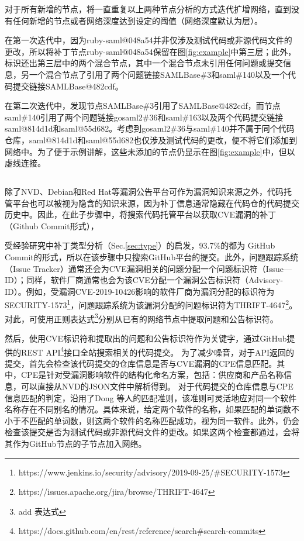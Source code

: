 对于所有新增的节点，\tool 将一直重复以上两种节点分析的方式迭代扩增网络，直到没有任何新增的节点或者网络深度达到设定的阈值（网络深度默认为层）。

\begin{exmp}
在第一次迭代中，因为ruby-saml@048a54并非仅涉及测试代码或非源代码文件的更改，所以\tool 将补丁节点ruby-saml@048a54保留在图\ref{fig:example}中第三层；此外，\tool 标识还出第三层中的两个混合节点，其中一个混合节点未引用任何问题或提交信息，另一个混合节点了引用了两个问题链接SAMLBase\#3和saml\#140以及一个代码提交链接SAMLBase@482cdf。 

在第二次迭代中，\tool 发现节点SAMLBase\#3引用了SAMLBase@482cdf，而节点saml\#140引用了两个问题链接gosaml2\#36和saml\#163以及两个代码提交链接saml@814d1d和saml@55d682。考虑到gosaml2\#36与saml\#140并不属于同个代码仓库，saml@814d1d和saml@55d682也仅涉及测试代码的更改，\tool 便不将它们添加到网络中。为了便于示例讲解，这些未添加的节点仍显示在图\ref{fig:example}中，但以虚线连接。 %
\end{exmp}

\subsection{}
除了NVD、Debian和Red Hat等漏洞公告平台可作为漏洞知识来源之外，代码托管平台也可以被视为隐含的知识来源，因为补丁信息通常隐藏在代码仓的代码提交历史中。因此，在此子步骤中，\tool 将搜索代码托管平台以获取CVE漏洞的补丁（Github Commit形式），

受经验研究中补丁类型分析（Sec.\ref{sec:type}）的启发，93.7\%的都为 GitHub Commit的形式，所以在该步骤中\tool 只搜索GitHub平台的提交。此外，问题跟踪系统（Issue Tracker）通常还会为CVE漏洞相关的问题分配一个问题标识符（Issue—ID）；同样，软件厂商通常也会为该CVE分配一个漏洞公告标识符（Advisory-ID）。例如，受漏洞CVE-2019-10426影响的软件厂商为漏洞分配的标识符为SECURITY-1573\footnote{https://www.jenkins.io/security/advisory/2019-09-25/\#SECURITY-1573}，问题跟踪系统为该漏洞分配的问题标识符为THRIFT-4647\footnote{https://issues.apache.org/jira/browse/THRIFT-4647}。对此，\tool 可使用正则表达式\footnote{add 表达式}分别从已有的网络节点中提取问题和公告标识符。

然后，\tool 使用CVE标识符和提取出的问题和公告标识符作为关键字，通过GitHub提供的REST API\footnote{https://docs.github.com/en/rest/reference/search\#search-commits}接口全站搜索相关的代码提交。%
为了减少噪音，对于API返回的提交，\tool 首先会检查该代码提交的仓库信息是否与CVE漏洞的CPE信息匹配。其中，CPE是针对受漏洞影响软件的结构化命名方案，包括：供应商和产品名称信息，可以直接从NVD的JSON文件中解析得到。
对于代码提交的仓库信息与CPE信息匹配的判定，\tool 沿用了Dong 等人的匹配准则\cite{dong2019towards}，该准则可灵活地应对同一个软件名称存在不同别名的情况。具体来说，给定两个软件的名称，如果匹配的单词数不小于不匹配的单词数，则这两个软件的名称匹配成功，视为同一软件。此外，\tool 仍会检查该提交是否为测试代码或非源代码文件的更改。如果这两个检查都通过，\tool 会将其作为GitHub节点的子节点加入网络。


